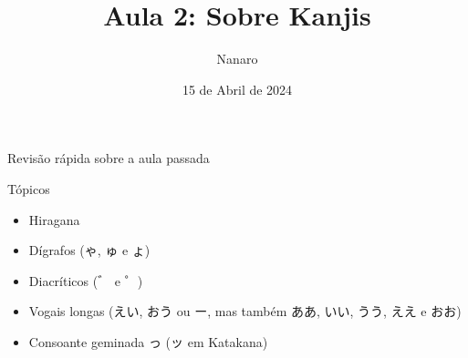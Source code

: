 \documentclass[11pt, aspectratio=43]{beamer}
\title{Aula 2: Sobre Kanjis}
\author{Nanaro}
\date[15/4/24]{15 de Abril de 2024}
\begin{document}
\maketitle
\begin{frame}{Revisão rápida sobre a aula passada}%

\begin{block}{\centering Tópicos}
\begin{itemize}
	\item<1-> Hiragana
	\item<2-> Dígrafos (ゃ, ゅ e ょ)
	\item<3-> Diacríticos (゛ e ゜)
	\item<4-> Vogais longas (えい, おう ou ー, mas também ああ, いい, うう, ええ e おお)
	\item<5-> Consoante geminada っ (ッ em Katakana)
\end{itemize}
\end{block}

\end{frame}

\end{document}

